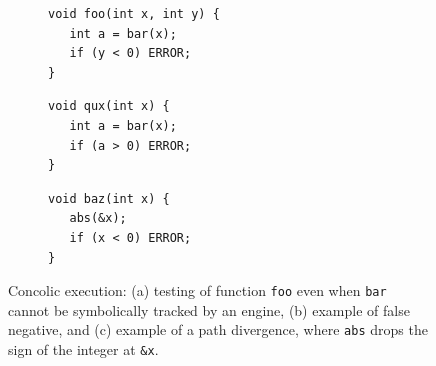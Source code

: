 \begin{figure}[t]
  \vspace{-2.5mm}
  \begin{subfigure}[t]{.33\textwidth}
    \begin{lstlisting}[basicstyle=\ttfamily\scriptsize]
void foo(int x, int y) {
   int a = bar(x);
   if (y < 0) ERROR;
} 
\end{lstlisting}
    \vspace{-4mm}
    \caption{}
  \end{subfigure}%
  \begin{subfigure}[t]{.33\textwidth}
    \begin{lstlisting}[basicstyle=\ttfamily\scriptsize]
void qux(int x) {
   int a = bar(x);
   if (a > 0) ERROR;
} 
\end{lstlisting}
    \vspace{-4mm}
    \caption{}
  \end{subfigure}%
  \begin{subfigure}[t]{.33\textwidth}
    \begin{lstlisting}[basicstyle=\ttfamily\scriptsize]
void baz(int x) {
   abs(&x);
   if (x < 0) ERROR;
}   
\end{lstlisting}
    \vspace{-4mm}
    \caption{}
  \end{subfigure}%

  \vspace{-2mm}
  \caption{Concolic execution: (a) testing of function {\tt foo} even when {\tt bar} cannot be symbolically tracked by an engine, (b) example of false negative, and (c) example of a path divergence, where \texttt{abs} drops the sign of the integer at \texttt{\&x}.
   }
  \label{fig:example-concolic-problems}
  \vspace{-3mm}
\end{figure}

